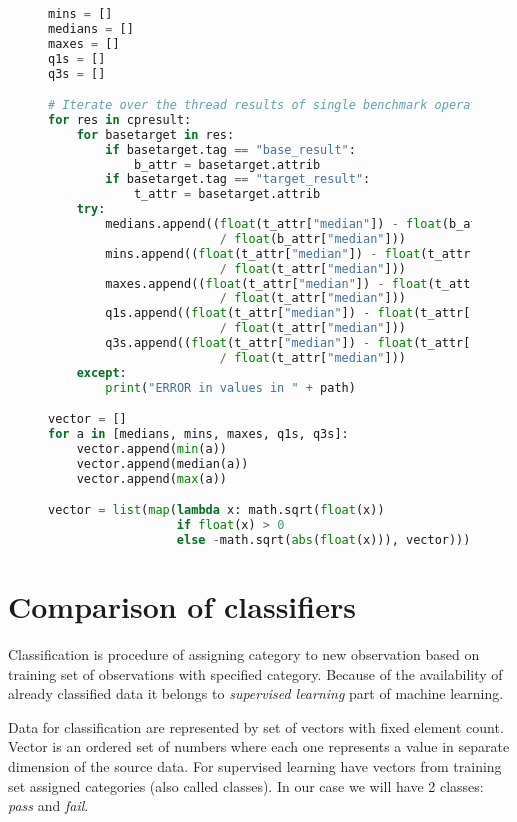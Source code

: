 \begin{figure}
  \small
  \begin{lstlisting}[language=Python]
mins = []
medians = []
maxes = []
q1s = []
q3s = []

# Iterate over the thread results of single benchmark operation
for res in cpresult:
    for basetarget in res:
        if basetarget.tag == "base_result":
            b_attr = basetarget.attrib
        if basetarget.tag == "target_result":
            t_attr = basetarget.attrib
    try:
        medians.append((float(t_attr["median"]) - float(b_attr["median"]))
                        / float(b_attr["median"]))
        mins.append((float(t_attr["median"]) - float(t_attr["min"]))
                        / float(t_attr["median"]))
        maxes.append((float(t_attr["median"]) - float(t_attr["max"]))
                        / float(t_attr["median"]))
        q1s.append((float(t_attr["median"]) - float(t_attr["first_q"]))
                        / float(t_attr["median"]))
        q3s.append((float(t_attr["median"]) - float(t_attr["third_q"]))
                        / float(t_attr["median"]))
    except:
        print("ERROR in values in " + path)

vector = []
for a in [medians, mins, maxes, q1s, q3s]:
    vector.append(min(a))
    vector.append(median(a))
    vector.append(max(a))

vector = list(map(lambda x: math.sqrt(float(x))
                  if float(x) > 0
                  else -math.sqrt(abs(float(x))), vector)))
  \end{lstlisting}
  \normalsize
  \caption{}
  \label{fig:learn_preprocess}
\end{figure}

\section{Comparison of classifiers} \label{sec:classifier_comparison}
Classification is procedure of assigning category to new observation based on
training set of observations with specified category. Because of the
availability of already classified data it belongs to \emph{supervised learning}
part of machine learning.

Data for classification are represented by set of vectors with fixed element
count. Vector is an ordered set of numbers where each one represents a value in
separate dimension of the source data. For supervised learning have vectors from
training set assigned categories (also called classes). In our case we will have
2 classes: \emph{pass} and \emph{fail}.

